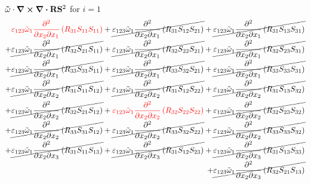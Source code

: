 $\mathbf{\tilde{\omega}}\cdot\curl \div \mathbf{R} \mathbf{S}^2$ for $i=1$
\begin{equation}
	\begin{split}
{\color{red}\varepsilon_{123}\tilde{\omega}_{1}\pdv{}{x_{2}}{x_{1}}\left(R_{31}S_{11}S_{11}\right)}
		+\cancel{\varepsilon_{123}\tilde{\omega}_{1}\pdv{}{x_{2}}{x_{1}}\left(R_{31}S_{12}S_{21}\right)}
		+\cancel{\varepsilon_{123}\tilde{\omega}_{1}\pdv{}{x_{2}}{x_{1}}\left(R_{31}S_{13}S_{31}\right)}\\
		+\cancel{\varepsilon_{123}\tilde{\omega}_{1}\pdv{}{x_{2}}{x_{1}}\left(R_{32}S_{21}S_{11}\right)}
		+\cancel{\varepsilon_{123}\tilde{\omega}_{1}\pdv{}{x_{2}}{x_{1}}\left(R_{32}S_{22}S_{21}\right)}
		+\cancel{\varepsilon_{123}\tilde{\omega}_{1}\pdv{}{x_{2}}{x_{1}}\left(R_{32}S_{23}S_{31}\right)}\\
		+\cancel{\varepsilon_{123}\tilde{\omega}_{1}\pdv{}{x_{2}}{x_{1}}\left(R_{33}S_{31}S_{11}\right)}
		+\cancel{\varepsilon_{123}\tilde{\omega}_{1}\pdv{}{x_{2}}{x_{1}}\left(R_{33}S_{32}S_{21}\right)}
		+\cancel{\varepsilon_{123}\tilde{\omega}_{1}\pdv{}{x_{2}}{x_{1}}\left(R_{33}S_{33}S_{31}\right)}\\
		+\cancel{\varepsilon_{123}\tilde{\omega}_{1}\pdv{}{x_{2}}{x_{2}}\left(R_{31}S_{11}S_{12}\right)}
		+\cancel{\varepsilon_{123}\tilde{\omega}_{1}\pdv{}{x_{2}}{x_{2}}\left(R_{31}S_{12}S_{22}\right)}
		+\cancel{\varepsilon_{123}\tilde{\omega}_{1}\pdv{}{x_{2}}{x_{2}}\left(R_{31}S_{13}S_{32}\right)}\\
		+\cancel{\varepsilon_{123}\tilde{\omega}_{1}\pdv{}{x_{2}}{x_{2}}\left(R_{32}S_{21}S_{12}\right)}
		+{\color{red}\varepsilon_{123}\tilde{\omega}_{1}\pdv{}{x_{2}}{x_{2}}\left(R_{32}S_{22}S_{22}\right)}
		+\cancel{\varepsilon_{123}\tilde{\omega}_{1}\pdv{}{x_{2}}{x_{2}}\left(R_{32}S_{23}S_{32}\right)}\\
		+\cancel{\varepsilon_{123}\tilde{\omega}_{1}\pdv{}{x_{2}}{x_{2}}\left(R_{33}S_{31}S_{12}\right)}
		+\cancel{\varepsilon_{123}\tilde{\omega}_{1}\pdv{}{x_{2}}{x_{2}}\left(R_{33}S_{32}S_{22}\right)}
		+\cancel{\varepsilon_{123}\tilde{\omega}_{1}\pdv{}{x_{2}}{x_{2}}\left(R_{33}S_{33}S_{32}\right)}\\
		+\cancel{\varepsilon_{123}\tilde{\omega}_{1}\pdv{}{x_{2}}{x_{3}}\left(R_{31}S_{11}S_{13}\right)}
		+\cancel{\varepsilon_{123}\tilde{\omega}_{1}\pdv{}{x_{2}}{x_{3}}\left(R_{31}S_{12}S_{23}\right)}
		+\cancel{\varepsilon_{123}\tilde{\omega}_{1}\pdv{}{x_{2}}{x_{3}}\left(R_{31}S_{13}S_{33}\right)}\\
		+\cancel{\varepsilon_{123}\tilde{\omega}_{1}\pdv{}{x_{2}}{x_{3}}\left(R_{32}S_{21}S_{13}\right)}

\end{split}
\end{equation}
